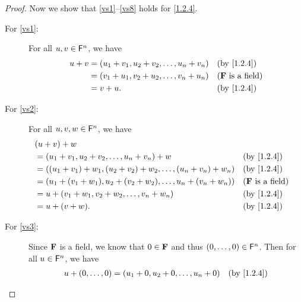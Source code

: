 \begin{proof}
    Now we show that \ref{vs1}--\ref{vs8} holds for \cref{1.2.4}.
    \begin{description}
        \item[For \ref{vs1}:]
            For all \(u, v \in \mathsf{F}^{n}\), we have
            \begin{align*}
                u + v & = \p{u_{1} + v_{1}, u_{2} + v_{2}, \dots, u_{n} + v_{n}} &  & \text{(by \cref{1.2.4})}   \\
                      & = \p{v_{1} + u_{1}, v_{2} + u_{2}, \dots, v_{n} + u_{n}} &  & \text{(\(\F\) is a field)} \\
                      & = v + u.                                                 &  & \text{(by \cref{1.2.4})}
            \end{align*}
        \item[For \ref{vs2}:]
            For all \(u, v, w \in \mathsf{F}^{n}\), we have
            \begin{align*}
                 & \p{u + v} + w                                                                                                                \\
                 & = \p{u_{1} + v_{1}, u_{2} + v_{2}, \dots, u_{n} + v_{n}} + w                                 &  & \text{(by \cref{1.2.4})}   \\
                 & = \p{\p{u_{1} + v_{1}} + w_{1}, \p{u_{2} + v_{2}} + w_{2}, \dots, \p{u_{n} + v_{n}} + w_{n}} &  & \text{(by \cref{1.2.4})}   \\
                 & = \p{u_{1} + \p{v_{1} + w_{1}}, u_{2} + \p{v_{2} + w_{2}}, \dots, u_{n} + \p{v_{n} + w_{n}}} &  & \text{(\(\F\) is a field)} \\
                 & = u + \p{v_{1} + w_{1}, v_{2} + w_{2}, \dots, v_{n} + w_{n}}                                 &  & \text{(by \cref{1.2.4})}   \\
                 & = u + \p{v + w}.                                                                             &  & \text{(by \cref{1.2.4})}
            \end{align*}
        \item[For \ref{vs3}:]
            Since \(\mathbf{F}\) is a field, we know that \(0 \in \mathbf{F}\) and thus \(\left\lparen0, \dots, 0\right\rparen \in \mathsf{F}^{n}\).
            Then for all \(u \in \mathsf{F}^{n}\), we have
            \begin{align*}
                u + \p{0, \dots, 0} & = \p{u_{1} + 0, u_{2} + 0, \dots, u_{n} + 0} &  & \text{(by \cref{1.2.4})}   \\

\end{align*}
\end{description}
\end{proof}

